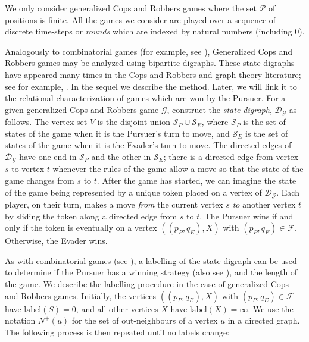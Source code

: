 \documentclass[12pt,reqno]{amsart}
\begin{document}
We only consider generalized Cops and Robbers games where the set $\mathcal{P}$ of positions is finite.  All the games we consider are played over a sequence of discrete time-steps or
\emph{rounds} which are indexed by natural numbers (including $0$).

Analogously to combinatorial games (for example, see \cite{Smith}),
Generalized Cops and Robbers games may be analyzed using bipartite digraphs.
These state digraphs have appeared many
times in the Cops and Robbers and graph theory literature; see for example, \cite{acp,cm,ffn,HM}.
In the sequel we describe the method.
Later, we will link it to the relational characterization of games which are won by the Pursuer.
For a given generalized Cops and
Robbers game $\mathcal{G}$, construct the \emph{state digraph}, $\mathcal{D}_\mathcal{G}$ as follows. The vertex set $V$ is the disjoint union $\mathcal{S}_P \cup \mathcal{S}_E$, where
$\mathcal{S}_P$ is the set of states of the game when it is the Pursuer's turn to move, and $\mathcal{S}_E$ is the set of states of the game when it is the Evader's turn to move.  The directed edges
of $\mathcal{D}_\mathcal{G}$ have one end in $\mathcal{S}_P$ and the other in $\mathcal{S}_E$; there is a directed edge from vertex $s$ to vertex $t$ whenever the rules of the game allow a move so
that the state of the game changes from $s$ to $t$. After the game has started, we can imagine the state of the game being represented by a unique token placed on a vertex of
$\mathcal{D}_\mathcal{G}$. Each player, on their turn, makes a move \emph{from} the current vertex $s$ \emph{to} another vertex $t$ by sliding the token along a directed edge from $s$ to $t$. The
Pursuer wins if and only if the token is eventually on a vertex $((p_P, q_E), X)$ with $(p_P, q_E) \in \mathcal{F}$.  Otherwise, the Evader wins.

As with combinatorial games (see \cite{Smith,Steinhaus}), a labelling of the state digraph can be used
to determine if the Pursuer has a winning strategy (also see \cite{BI,HM}), and the length of the game.
We describe the labelling procedure in the case of generalized Cops and Robbers games.
Initially, the vertices $((p_P,
q_E), X)$ with $(p_P, q_E) \in \mathcal{F}$ have $\mathrm{label}(S) = 0$, and all other vertices $X$ have  $\mathrm{label}(X) = \infty$.  We use the notation $N^+(u)$ for the set of out-neighbours of
a vertex $u$ in a directed graph. The following process is then repeated until no labels change:
\end{document}
